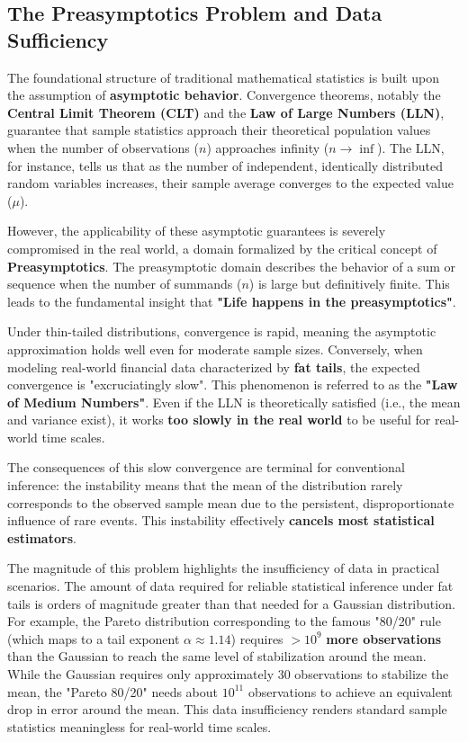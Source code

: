 \documentclass{ieeetj}
\begin{document}
\subsection{The Preasymptotics Problem and Data Sufficiency}

The foundational structure of traditional mathematical statistics is built upon the assumption of \textbf{asymptotic behavior}. Convergence theorems, notably the \textbf{Central Limit Theorem (CLT)} and the \textbf{Law of Large Numbers (LLN)}, guarantee that sample statistics approach their theoretical population values when the number of observations ($n$) approaches infinity ($n\to \inf$). The LLN, for instance, tells us that as the number of independent, identically distributed random variables increases, their sample average converges to the expected value ($\mu$).

However, the applicability of these asymptotic guarantees is severely compromised in the real world, a domain formalized by the critical concept of \textbf{Preasymptotics}. The preasymptotic domain describes the behavior of a sum or sequence when the number of summands ($n$) is large but definitively finite. This leads to the fundamental insight that \textbf{"Life happens in the preasymptotics"}.

Under thin-tailed distributions, convergence is rapid, meaning the asymptotic approximation holds well even for moderate sample sizes. Conversely, when modeling real-world financial data characterized by \textbf{fat tails}, the expected convergence is "excruciatingly slow". This phenomenon is referred to as the \textbf{"Law of Medium Numbers"}. Even if the LLN is theoretically satisfied (i.e., the mean and variance exist), it works \textbf{too slowly in the real world} to be useful for real-world time scales.

The consequences of this slow convergence are terminal for conventional inference: the instability means that the mean of the distribution rarely corresponds to the observed sample mean due to the persistent, disproportionate influence of rare events. This instability effectively \textbf{cancels most statistical estimators}.

The magnitude of this problem highlights the insufficiency of data in practical scenarios. The amount of data required for reliable statistical inference under fat tails is orders of magnitude greater than that needed for a Gaussian distribution. For example, the Pareto distribution corresponding to the famous "80/20" rule (which maps to a tail exponent $\alpha \approx 1.14$) requires $>10^9$ \textbf{more observations} than the Gaussian to reach the same level of stabilization around the mean. While the Gaussian requires only approximately 30 observations to stabilize the mean, the "Pareto 80/20" needs about $10^{11}$ observations to achieve an equivalent drop in error around the mean. This data insufficiency renders standard sample statistics meaningless for real-world time scales.
\end{document}
